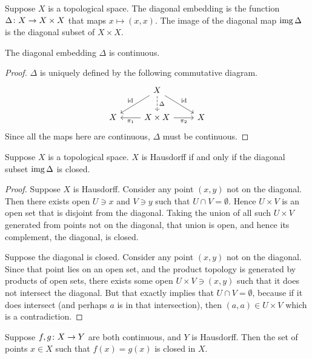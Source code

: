\begin{definition}
    Suppose \(X\) is a topological space.
    The diagonal embedding is the function \(\Delta\colon X\to X \times X\) that maps \(x \mapsto (x,x)\).
    The image of the diagonal map \(\operatorname{img}\Delta\) is the diagonal subset of \(X \times X\).
\end{definition}
\begin{lemma}
    The diagonal embedding \(\Delta\) is continuous.
\end{lemma}
\begin{proof}
    \(\Delta\) is uniquely defined by the following commutative diagram.
    \begin{equation*}
        \begin{tikzcd}
            & X \arrow{dl}[swap]{\id} \arrow{dr}{\id} \arrow[dashrightarrow]{d}{\Delta} \\
            X & X \times X \arrow{l}{\pi_1} \arrow{r}[swap]{\pi_2} & X
        \end{tikzcd}
    \end{equation*}
    Since all the maps here are continuous, \(\Delta\) must be continuous.
\end{proof}
\begin{lemma}\label{lem:diagonal-closed-hausdorff}
    Suppose \(X\) is a topological space.
    \(X\) is Hausdorff if and only if the diagonal subset \(\operatorname{img}\Delta\) is closed.
\end{lemma}
\begin{proof}
    Suppose \(X\) is Hausdorff.
    Consider any point \((x,y)\) not on the diagonal.
    Then there exists open \(U \ni x\) and \(V \ni y\) such that \(U \cap V = \emptyset\).
    Hence \(U \times V\) is an open set that is disjoint from the diagonal.
    Taking the union of all such \(U \times V\) generated from points not on the diagonal,
    that union is open, and hence its complement, the diagonal, is closed.

    Suppose the diagonal is closed.
    Consider any point \((x,y)\) not on the diagonal.
    Since that point lies on an open set,
    and the product topology is generated by products of open sets,
    there exists some open \(U \times V \ni (x,y)\) such that it does not intersect the diagonal.
    But that exactly implies that \(U \cap V = \emptyset\),
    because if it does intersect (and perhaps \(a\) is in that intersection),
    then \((a,a) \in U \times V\) which is a contradiction.
\end{proof}
\begin{lemma}\label{lem:cont-agree-closed}
    Suppose \(f,g\colon X\to Y\) are both continuous, and \(Y\) is Hausdorff.
    Then the set of points \(x \in X\) such that \(f(x) = g(x)\) is closed in \(X\).
\end{lemma}
